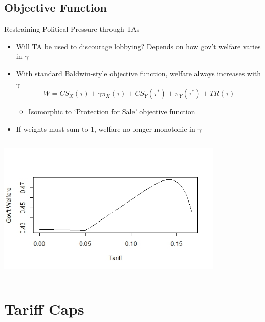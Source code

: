 \documentclass[handout]{beamer}
\newcommand{\ga}{\gamma}
\begin{document}
\subsection{Objective Function}
\begin{frame}{Restraining Political Pressure through TAs}
\pause
\begin{itemize}[<+->]
	\item Will TA be used to discourage lobbying? Depends on how gov't welfare varies in $\ga$
	\item With standard Baldwin-style objective function, welfare always increases with $\ga$
\[
  W = \mathit{CS}_X(\tau) + \ga \pi_X(\tau) + \mathit{CS}_Y(\tau^*) + \pi_Y(\tau^*) + \mathit{TR}(\tau)
\] 

	\begin{itemize}
		\item Isomorphic to `Protection for Sale' objective function
	\end{itemize}

	\item If weights must sum to 1, welfare no longer monotonic in $\ga$
\end{itemize}
\end{frame}

\begin{frame}
\includegraphics[height=2.75in, width=4.25in]{weight.jpeg}
\end{frame}


\section{Tariff Caps}
\end{document}
